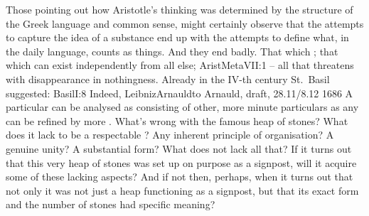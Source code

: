 Those pointing out how Aristotle's thinking was determined by the structure of
the Greek language and common sense, might certainly observe that the attempts
to capture the idea of a substance end up with the attempts to define what, in
the daily language, counts as {things}.  And they end badly. That which ; that
which can exist independently from all else; \citet{that which is primarily,
  i.e. not in a qualified sense but without qualification}{AristMeta}{VII:1} --
all that threatens with disappearance in nothingness.  Already in the IV-th
century St.~Basil suggested: \citet{Do not let us seek for any nature devoid of
  qualities by the conditions of its existence, but let us know that all the
  phenomena with which we see it clothed regard the conditions of its existence
  and complete its essence. Try to take away by reason each of the qualities it
  possesses, and you will arrive at nothing. Take away black, cold, weight,
  density, the qualities which concern taste, in one word all these which we see
  in it, and the substance vanishes.}{Basil}{I:8}
Indeed, \citet{there is no body of which I can say for certain
  that it is a substance rather than an aggregation of several substances, or
  perhaps a phenomenon.}{LeibnizArnauld}{to Arnauld, draft, 28.11/8.12 1686} A
particular can be analysed as consisting of other, more minute
particulars as any  can be refined by more
. What's wrong with the famous heap of stones? 
What does it lack to be a respectable ? Any inherent principle of
organisation? A genuine unity? A substantial form? What does not lack all that?
If it turns out that this very heap of stones was set up on purpose as a
signpost, will it acquire some of these lacking aspects? And if not then,
perhaps, when it turns out that not only it was not just a heap functioning as a
signpost, but that its exact form and the number of stones had specific meaning?

